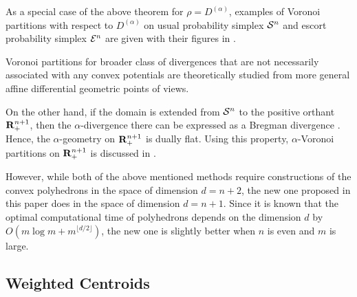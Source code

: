 \documentclass{llncs}
\begin{document}
As a special case of the above theorem for $\rho=D^{(\alpha)}$, 
examples of Voronoi partitions with respect to $D^{(\alpha)}$ on 
usual probability simplex ${\cal S}^n$ and escort probability simplex 
${\cal E}^n$ are given with their figures in \cite{OMA12}.



\medskip
\begin{remark} 
Voronoi partitions for broader class of divergences 
that are not necessarily associated with any convex potentials are 
theoretically studied \cite{Matsu2} from more general 
affine differential geometric points of views.

On the other hand, if the domain is extended from ${\cal S}^n$ 
to the positive orthant ${\bf R}_+^{n+1}$, 
then the $\alpha$-divergence there can be expressed 
as a Bregman divergence \cite{Amari85,AN,Ohara07}.
Hence, the $\alpha$-geometry on ${\bf R}_+^{n+1}$ is dually flat.
Using this property, $\alpha$-Voronoi partitions on ${\bf R}_+^{n+1}$ is 
discussed in \cite{NN}.

However, while both of the above mentioned methods require 
constructions of the convex polyhedrons in the space of dimension $d=n+2$, 
the new one proposed in this paper does in the space of dimension $d=n+1$.
Since it is known \cite{Chaz} that 
the optimal computational time of polyhedrons 
depends on the dimension $d$ by $O(m\log m+m^{\lfloor d/2 \rfloor})$, 
the new one is slightly better when $n$ is even and $m$ is large.
\end{remark}

\medskip

\subsection{Weighted Centroids}
\end{document}
